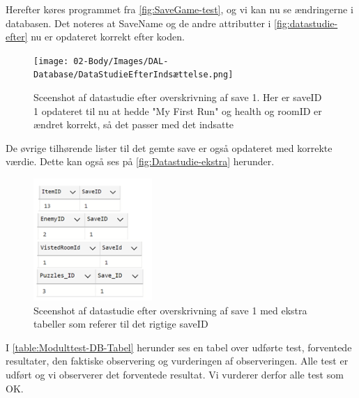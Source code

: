 Herefter køres programmet fra \autoref{fig:SaveGame-test}, og vi kan nu se ændringerne i databasen.
Det noteres at SaveName og de andre attributter i \autoref{fig:datastudie-efter} nu er opdateret korrekt efter koden.

\begin{figure}[H]
\centering
\texttt{[image: 02-Body/Images/DAL-Database/DataStudieEfterIndsættelse.png]}
\caption{Sceenshot af datastudie efter overskrivning af save 1. Her er saveID 1 opdateret til nu at hedde "My First Run" og health og roomID er ændret korrekt, så det passer med det indsatte}
\label{fig:datastudie-efter}
\end{figure}

\noindent De øvrige tilhørende lister til det gemte save er også opdateret med korrekte værdie. Dette kan også ses på \autoref{fig:Datastudie-ekstra} herunder.

\begin{figure}[H]
\centering
\includegraphics[width = 0.4\textwidth]{02-Body/Images/DAL-Database/Lister.png}
\caption{Sceenshot af datastudie efter overskrivning af save 1 med ekstra tabeller som referer til det rigtige saveID}
\label{fig:Datastudie-ekstra}
\end{figure}

\noindent I \autoref{table:Modulttest-DB-Tabel} herunder ses en tabel over udførte test, forventede resultater, den faktiske observering og vurderingen af observeringen.
Alle test er udført og vi observerer det forventede resultat. Vi vurderer derfor alle test som OK.

